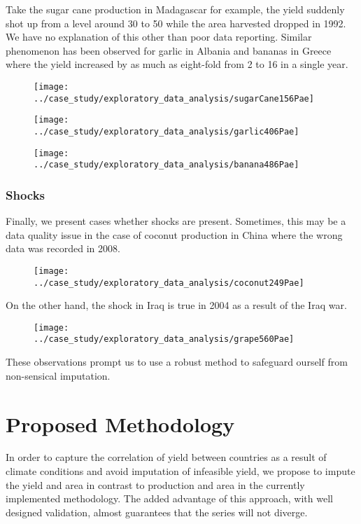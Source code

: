 \documentclass[nojss]{jss}\usepackage[]{graphicx}\usepackage[]{color}
\begin{document}
Take the sugar cane production in Madagascar for example, the yield
suddenly shot up from a level around 30 to 50 while the area harvested
dropped in 1992. We have no explanation of this other than poor data
reporting. Similar phenomenon has been observed for garlic in Albania
and bananas in Greece where the yield increased by as much as
eight-fold from 2 to 16 in a single year.

\begin{figure}[!ht]
  \centering \texttt{[image: ../case\_study/exploratory\_data\_analysis/sugarCane156Pae]}
\end{figure}

\begin{figure}[!ht]
  \centering
  \texttt{[image: ../case\_study/exploratory\_data\_analysis/garlic406Pae]}
\end{figure}

\begin{figure}[!ht]
  \centering
  \texttt{[image: ../case\_study/exploratory\_data\_analysis/banana486Pae]}
\end{figure}




\FloatBarrier
\subsubsection{Shocks}

Finally, we present cases whether shocks are present. Sometimes, this
may be a data quality issue in the case of coconut production in China
where the wrong data was recorded in 2008.

\begin{figure}[!ht]
  \centering
  \texttt{[image: ../case\_study/exploratory\_data\_analysis/coconut249Pae]}
\end{figure}


On the other hand, the shock in Iraq is true in 2004 as a result of
the Iraq war.
\begin{figure}[!ht]
  \centering
  \texttt{[image: ../case\_study/exploratory\_data\_analysis/grape560Pae]}
\end{figure}

These observations prompt us to use a robust method to safeguard
ourself from non-sensical imputation.

\FloatBarrier
\section{Proposed Methodology}
In order to capture the correlation of yield between countries as a
result of climate conditions and avoid imputation of infeasible yield,
we propose to impute the yield and area in contrast to production and
area in the currently implemented methodology. The added advantage of
this approach, with well designed validation, almost guarantees that
the series will not diverge.
\end{document}
